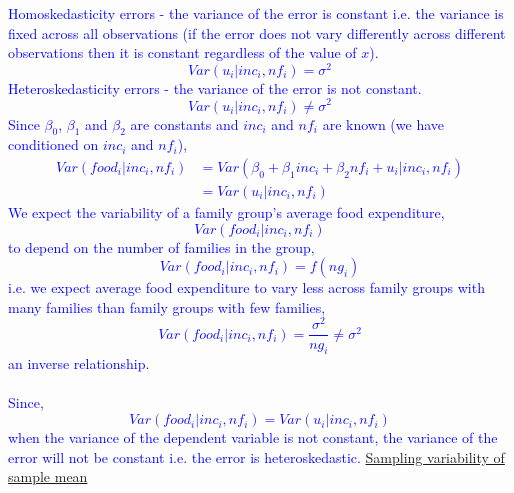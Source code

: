 \documentclass[12pt]{report}
\newenvironment{blueframed}[1][blue]
{\def\FrameCommand{\fboxsep=\FrameSep\fcolorbox{#1}{white}}%
\MakeFramed {\advance\hsize-\width \FrameRestore}}
{\endMakeFramed}
\begin{document}
\begin{blueframed}
	\noindent \textcolor{blue}
	{
		Homoskedasticity errors - the variance of the error is constant i.e. the variance is fixed across all observations (if the error does not vary differently across different observations then it is constant regardless of the value of $x$).
		$$Var(u_i|inc_i,nf_i) = \sigma^2$$
		Heteroskedasticity errors - the variance of the error is not constant.
		$$Var(u_i|inc_i,nf_i) \neq \sigma^2$$
		Since $\beta_0$, $\beta_1$ and $\beta_2$ are constants and $inc_i$ and $nf_i$ are known (we have conditioned on $inc_i$ and $nf_i$),
		\begin{align*}
		Var(food_i|inc_i,nf_i) &= Var(\beta_0 + \beta_1inc_i + \beta_2nf_i + u_i|inc_i,nf_i) \\ 
		&= Var(u_i|inc_i,nf_i)
		\end{align*}
		We expect the variability of a family group's average food expenditure, $$Var(food_i|inc_i,nf_i)$$ to depend on the number of families in the group, $$Var(food_i|inc_i,nf_i) = f(ng_i)$$ i.e. we expect average food expenditure to vary less across family groups with many families than family groups with few families, $$Var(food_i|inc_i,nf_i) = \dfrac{\sigma^2}{ng_i} \neq \sigma^2$$ an inverse relationship. \\ \\ 
		Since, $$Var(food_i|inc_i,nf_i) = Var(u_i|inc_i,nf_i)$$ when the variance of the dependent variable is not constant, the variance of the error will not be constant i.e. the error is heteroskedastic.
	}
\end{blueframed}
\noindent \uline{Sampling variability of sample mean}
\end{document}
